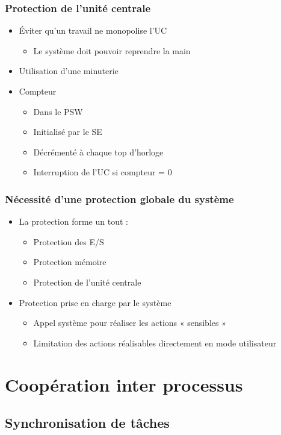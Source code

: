 \begin{frame}
 \frametitle{Protection de l’unité centrale}
 \begin{itemize}
 \item Éviter qu’un travail ne monopolise l’UC
\begin{itemize}
\item Le système doit pouvoir reprendre la main
\end{itemize}
\item Utilisation d’une minuterie
\item Compteur
\begin{itemize}
\item Dans le PSW
\item Initialisé par le SE
\item Décrémenté à chaque top d’horloge
\item Interruption de l’UC si compteur = 0
\end{itemize}
 \end{itemize}
\end{frame}


\begin{frame}
 \frametitle{Nécessité d'une protection globale du système}
 \begin{itemize}
 \item La protection forme un tout :
\begin{itemize}
\item Protection des E/S
\item Protection mémoire
\item Protection de l’unité centrale
\end{itemize}
\item Protection prise en charge par le système 
\begin{itemize}
\item Appel système pour réaliser les actions « sensibles »
\item Limitation des actions réalisables directement en mode utilisateur
\end{itemize}
 \end{itemize}
\end{frame}



\section{Coopération inter processus}
\subsection{Synchronisation de tâches}

